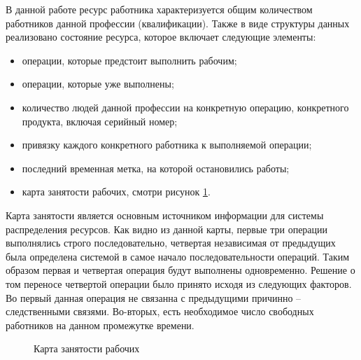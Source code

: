 В данной работе ресурс работника характеризуется общим количеством работников данной профессии (квалификации). Также в виде структуры данных реализовано состояние ресурса, которое включает следующие элементы:

\begin{itemize}
	\item операции, которые предстоит выполнить рабочим; 
	\item операции, которые уже выполнены;
	\item количество людей данной профессии на конкретную операцию, конкретного продукта, включая серийный номер;
	\item привязку каждого конкретного работника к выполняемой операции;
	\item последний временная метка, на которой остановились работы;
	\item карта занятости рабочих, смотри рисунок \ref{ris:Staff}.
\end{itemize}

Карта занятости является основным источником информации для системы распределения ресурсов. Как видно из данной карты, первые три операции выполнялись строго последовательно, четвертая независимая от предыдущих была определена системой в самое начало последовательности операций. Таким образом первая и четвертая операция будут выполнены одновременно. Решение о том переносе четвертой операции было принято исходя из следующих факторов. Во первый данная операция не связанна с предыдущими причинно – следственными связями. Во-вторых, есть необходимое число свободных работников на данном промежутке времени.

\begin{figure}[H]
    \caption{Карта занятости рабочих}
    \label{ris:Staff}
\end{figure}

